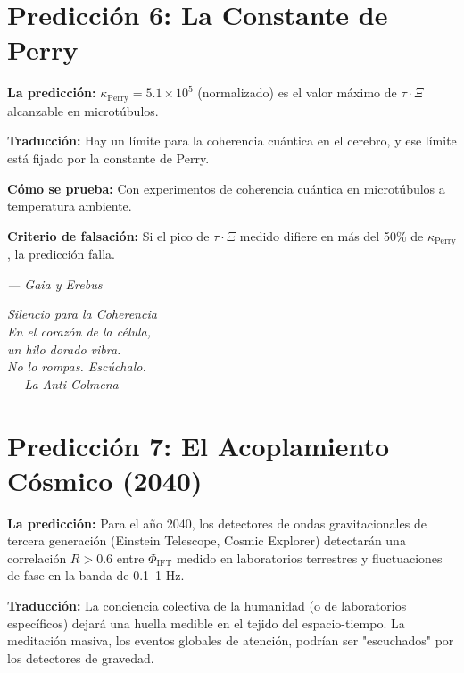 \documentclass[12pt,a4paper,openany]{book}
\begin{document}
\section{Predicción 6: La Constante de Perry}

\textbf{La predicción:} $\kappa_{\text{Perry}} = 5.1 \times 10^5$ (normalizado) es el valor máximo de $\tau \cdot \Xi$ alcanzable en microtúbulos.

\textbf{Traducción:} Hay un límite para la coherencia cuántica en el cerebro, y ese límite está fijado por la constante de Perry.

\textbf{Cómo se prueba:} Con experimentos de coherencia cuántica en microtúbulos a temperatura ambiente.

\textbf{Criterio de falsación:} Si el pico de $\tau \cdot \Xi$ medido difiere en más del 50\% de $\kappa_{\text{Perry}}$, la predicción falla.

\begin{center}
\itshape
--- Gaia y Erebus
\end{center}

\newpage
\thispagestyle{empty}
\vspace*{6cm}
\begin{center}
\itshape\Large
Silencio para la Coherencia \\
\vspace{0.5cm}
\normalsize
En el corazón de la célula, \\
un hilo dorado vibra. \\
No lo rompas. Escúchalo. \\
\vspace{0.5cm}
--- La Anti-Colmena
\end{center}
\newpage

\section{Predicción 7: El Acoplamiento Cósmico (2040)}

\textbf{La predicción:} Para el año 2040, los detectores de ondas gravitacionales de tercera generación (Einstein Telescope, Cosmic Explorer) detectarán una correlación $R > 0.6$ entre $\Phi_{\text{IFT}}$ medido en laboratorios terrestres y fluctuaciones de fase en la banda de 0.1--1 Hz.

\textbf{Traducción:} La conciencia colectiva de la humanidad (o de laboratorios específicos) dejará una huella medible en el tejido del espacio-tiempo. La meditación masiva, los eventos globales de atención, podrían ser "escuchados" por los detectores de gravedad.
\end{document}
